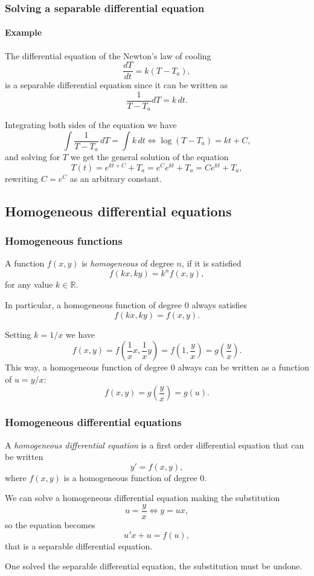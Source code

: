 \begin{frame}
\frametitle{Solving a separable differential equation}
\framesubtitle{Example}
The differential equation of the Newton's law of cooling 
\[\frac{dT}{dt}=k(T-T_a),\]
is a separable differential equation since it can be written as
\[\frac{1}{T-T_a}dT=k\,dt.\]

Integrating both sides of the equation we have
\[
\int \frac{1}{T-T_a}\,dT=\int k\,dt\Leftrightarrow \log(T-T_a)=kt+C,
\]
and solving for $T$ we get the general solution of the equation 
\[
T(t)=e^{kt+C}+T_a=e^Ce^{kt}+T_a=Ce^{kt}+T_a,
\]
rewriting $C=e^C$ as an arbitrary constant.
\end{frame}



\subsection{Homogeneous differential equations}
\begin{frame}
\frametitle{Homogeneous functions}
\begin{definition}
A function $f(x,y)$ is \emph{homogeneous} of degree $n$, if it is satisfied
\[f(kx,ky)= k^nf(x,y),\]
for any value $k\in \mathbb{R}$.
\end{definition}

In particular, a homogeneous function of degree $0$ always satisfies
\[f(kx,ky)=f(x,y).\]

Setting $k=1/x$ we have
\[
f(x,y)=f\left(\frac{1}{x}x,\frac{1}{x}y\right)=f\left(1,\frac{y}{x}\right)=g\left(\frac{y}{x}\right).
\]
This way, a homogeneous function of degree $0$ always can be written as a function of $u=y/x$:
\[f(x,y)=g\left(\frac{y}{x}\right)=g(u).\]
\end{frame}


\begin{frame}
\frametitle{Homogeneous differential equations}
\begin{definition}
A \emph{homogeneous differential equation} is a first order differential equation that can be written  
\[y'=f(x,y),\]
where $f(x,y)$ is a homogeneous function of degree $0$.
\end{definition}

We can solve a homogeneous differential equation making the substitution
\[
u=\frac{y}{x}\Leftrightarrow y=ux,
\]
so the equation becomes
\[
u'x+u=f(u),
\]
that is a separable differential equation.

One solved the separable differential equation, the substitution must be undone.
\end{frame}


